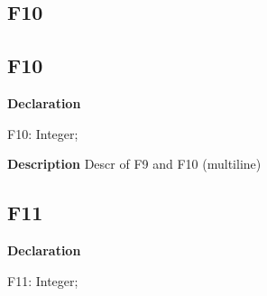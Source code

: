 \documentclass{report}
\newif\ifpdf
\begin{document}
\subsection*{\large{\textbf{F10}}\normalsize\hspace{1ex}\hrulefill}
\else
\subsection*{F10}
\fi
\label{ok_multiple_fields-F10}
\begin{list}{}{
\setlength{\itemindent}{0cm}
\setlength{\listparindent}{0cm}
\setlength{\leftmargin}{\evensidemargin}
\addtolength{\leftmargin}{\tmplength}
\settowidth{\labelsep}{X}
\addtolength{\leftmargin}{\labelsep}
\setlength{\labelwidth}{\tmplength}
}
\item[\textbf{Declaration}\hfill]
\ifpdf
\begin{flushleft}
\fi
\begin{ttfamily}
F10: Integer;\end{ttfamily}

\ifpdf
\end{flushleft}
\fi

\par
\item[\textbf{Description}]
Descr of F9 and F10 (multiline)

\end{list}
\ifpdf
\subsection*{\large{\textbf{F11}}\normalsize\hspace{1ex}\hrulefill}
\else
\subsection*{F11}
\fi
\label{ok_multiple_fields-F11}
\begin{list}{}{
\setlength{\itemindent}{0cm}
\setlength{\listparindent}{0cm}
\setlength{\leftmargin}{\evensidemargin}
\addtolength{\leftmargin}{\tmplength}
\settowidth{\labelsep}{X}
\addtolength{\leftmargin}{\labelsep}
\setlength{\labelwidth}{\tmplength}
}
\item[\textbf{Declaration}\hfill]
\ifpdf
\begin{flushleft}
\fi
\begin{ttfamily}
F11: Integer;\end{ttfamily}

\ifpdf
\end{flushleft}
\fi

\end{list}
\ifpdf
\end{document}
